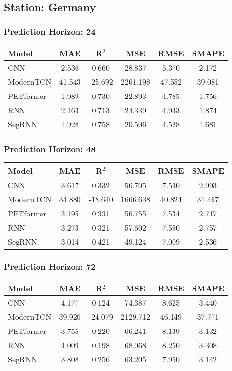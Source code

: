 \subsection*{Station: Germany}
\subsubsection*{Prediction Horizon: 24}
\begin{tabular}{lccccc}
\toprule
Model & MAE & R$^2$ & MSE & RMSE & SMAPE \\
\midrule
CNN & 2.536 & 0.660 & 28.837 & 5.370 & 2.172 \\
ModernTCN & 41.543 & -25.692 & 2261.198 & 47.552 & 39.081 \\
PETformer & 1.989 & 0.730 & 22.893 & 4.785 & 1.756 \\
RNN & 2.163 & 0.713 & 24.339 & 4.933 & 1.874 \\
SegRNN & 1.928 & 0.758 & 20.506 & 4.528 & 1.681 \\
\bottomrule
\end{tabular}
\vspace{0.5cm}
\subsubsection*{Prediction Horizon: 48}
\begin{tabular}{lccccc}
\toprule
Model & MAE & R$^2$ & MSE & RMSE & SMAPE \\
\midrule
CNN & 3.617 & 0.332 & 56.705 & 7.530 & 2.993 \\
ModernTCN & 34.880 & -18.640 & 1666.638 & 40.824 & 31.467 \\
PETformer & 3.195 & 0.331 & 56.755 & 7.534 & 2.717 \\
RNN & 3.273 & 0.321 & 57.602 & 7.590 & 2.757 \\
SegRNN & 3.014 & 0.421 & 49.124 & 7.009 & 2.536 \\
\bottomrule
\end{tabular}
\vspace{0.5cm}
\subsubsection*{Prediction Horizon: 72}
\begin{tabular}{lccccc}
\toprule
Model & MAE & R$^2$ & MSE & RMSE & SMAPE \\
\midrule
CNN & 4.177 & 0.124 & 74.387 & 8.625 & 3.440 \\
ModernTCN & 39.920 & -24.079 & 2129.712 & 46.149 & 37.771 \\
PETformer & 3.755 & 0.220 & 66.241 & 8.139 & 3.132 \\
RNN & 4.009 & 0.198 & 68.068 & 8.250 & 3.308 \\
SegRNN & 3.808 & 0.256 & 63.205 & 7.950 & 3.142 \\
\bottomrule
\end{tabular}
\vspace{0.5cm}